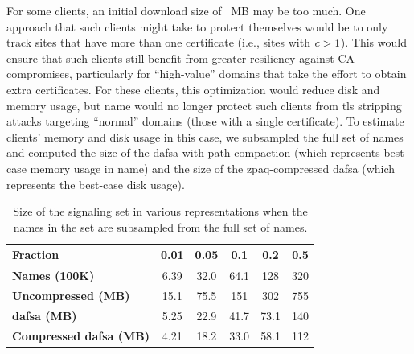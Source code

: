 
For some clients, an initial download size of \fsapczpaqmedsize{}~MB may be too
much. One approach that such clients might take to protect themselves would be
to only track sites that have more than one certificate (i.e., sites with
$c > 1$). This would ensure that such clients still benefit from greater
resiliency against CA compromises, particularly for ``high-value'' domains that
take the effort to obtain extra certificates. For these clients, this
optimization would reduce disk and memory usage, but \ac{name} would
no longer protect such clients from \ac{tls} stripping attacks targeting
``normal'' domains (those with a single certificate). To estimate clients'
memory and disk usage in this case, we subsampled the full set of names and
computed the size of the \ac{dafsa} with path compaction (which represents
best-case memory usage in \ac{name}) and the size of the zpaq-compressed
\ac{dafsa} (which represents the best-case disk usage).

\begin{table}[tbp]
  \centering
  \caption{Size of the signaling set in various representations when the names
  in the set are subsampled from the full set of names.}
  \begin{tabular}{|lccccc|}
    \toprule
    \textbf{Fraction} & \textbf{0.01} & \textbf{0.05} & \textbf{0.1} &
    \textbf{0.2} & \textbf{0.5} \\
    \midrule
    \textbf{Names (100K)} & 6.39 & 32.0 & 64.1 & 128 & 320 \\
    \midrule
    \textbf{Uncompressed (MB)} & 15.1 & 75.5 & 151 & 302 & 755 \\
    \textbf{\ac{dafsa} (MB)} & 5.25 & 22.9 & 41.7 & 73.1 & 140 \\
    \textbf{Compressed \ac{dafsa} (MB)} & 4.21 & 18.2 & 33.0 & 58.1 & 112 \\
    \bottomrule
  \end{tabular}
  \label{tab:sample}
\end{table}

